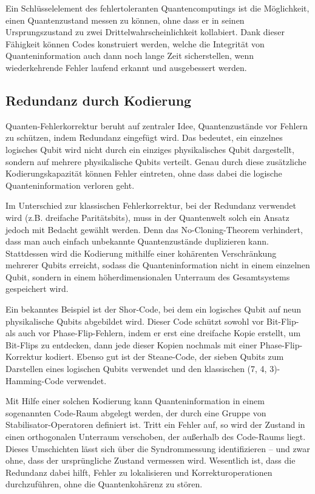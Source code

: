 Ein Schlüsselelement des fehlertoleranten Quantencomputings ist die Möglichkeit, einen Quantenzustand messen zu können, ohne dass er in seinen Ursprungszustand zu zwei Drittelwahrscheinlichkeit kollabiert. Dank dieser Fähigkeit können Codes konstruiert werden, welche die Integrität von Quanteninformation auch dann noch lange Zeit sicherstellen, wenn wiederkehrende Fehler laufend erkannt und ausgebessert werden.

\subsection{Redundanz durch Kodierung}
Quanten-Fehlerkorrektur beruht auf zentraler Idee, Quantenzustände vor Fehlern zu schützen, indem Redundanz eingefügt wird. Das bedeutet, ein einzelnes logisches Qubit wird nicht durch ein einziges physikalisches Qubit dargestellt, sondern auf mehrere physikalische Qubits verteilt. Genau durch diese zusätzliche Kodierungskapazität können Fehler eintreten, ohne dass dabei die logische Quanteninformation verloren geht.

Im Unterschied zur klassischen Fehlerkorrektur, bei der Redundanz verwendet wird (z.B. dreifache Paritätsbits), muss in der Quantenwelt solch ein Ansatz jedoch mit Bedacht gewählt werden. Denn das No-Cloning-Theorem verhindert, dass man auch einfach unbekannte Quantenzustände duplizieren kann. \cite{nielsen_michael_a_and_isaac_l_chuang_quantum_2010} Stattdessen wird die Kodierung mithilfe einer kohärenten Verschränkung mehrerer Qubits erreicht, sodass die Quanteninformation nicht in einem einzelnen Qubit, sondern in einem höherdimensionalen Unterraum des Gesamtsystems gespeichert wird.

Ein bekanntes Beispiel ist der Shor-Code, bei dem ein logisches Qubit auf neun physikalische Qubits abgebildet wird. Dieser Code schützt sowohl vor Bit-Flip- als auch vor Phase-Flip-Fehlern, indem er erst eine dreifache Kopie erstellt, um Bit-Flips zu entdecken, dann jede dieser Kopien nochmals mit einer Phase-Flip-Korrektur kodiert. \cite{shor_scheme_1995}
Ebenso gut ist der Steane-Code, der sieben Qubits zum Darstellen eines logischen Qubits verwendet und den klassischen (7, 4, 3)-Hamming-Code verwendet. \cite{Steane}

Mit Hilfe einer solchen Kodierung kann Quanteninformation in einem sogenannten Code-Raum abgelegt werden, der durch eine Gruppe von Stabilisator-Operatoren definiert ist. Tritt ein Fehler auf, so wird der Zustand in einen orthogonalen Unterraum verschoben, der außerhalb des Code-Raums liegt. Dieses Umschichten lässt sich über die Syndrommessung identifizieren – und zwar ohne, dass der ursprüngliche Zustand vermessen wird. Wesentlich ist, dass die Redundanz dabei hilft, Fehler zu lokalisieren und Korrekturoperationen durchzuführen, ohne die Quantenkohärenz zu stören.

